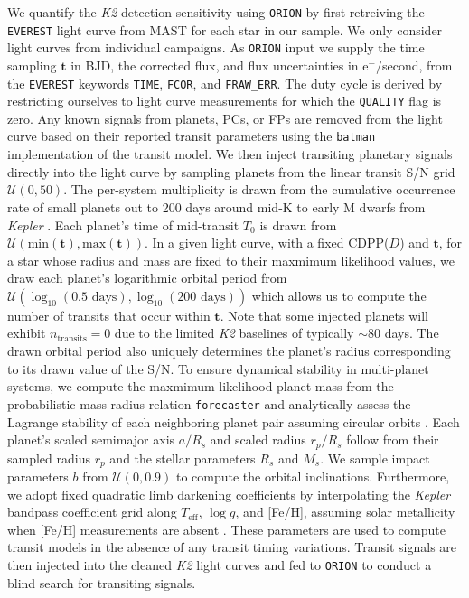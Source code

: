 \documentclass[twocolumn]{emulateapj}
\newcommand{\kepler}[1]{\emph{Kepler}#1}
\newcommand{\ktwo}[1]{\emph{K2}#1}
\newcommand{\teff}[1]{$T_{\text{eff}}$#1}
\newcommand{\logg}[1]{$\log{g}$#1}
\begin{document}
We quantify the \ktwo{} detection sensitivity using \texttt{ORION} by first retreiving the \texttt{EVEREST} light
curve from MAST for each star in our sample. We only consider light curves from individual campaigns. As
\texttt{ORION} input we supply the time sampling $\mathbf{t}$ in BJD, the corrected flux, and flux uncertainties
in e$^-$/second, from the \texttt{EVEREST} keywords \texttt{TIME}, \texttt{FCOR}, and \texttt{FRAW\_ERR}.
The duty cycle is derived by restricting ourselves to light curve
measurements for which the \texttt{QUALITY} flag is zero.
Any known signals from planets, PCs, or FPs are removed from the light
curve based on their reported transit parameters using the \texttt{batman} \citep{kreidberg15} implementation of
the \cite{mandel02} transit model. We then inject transiting planetary signals directly into the light curve
by sampling planets from the linear transit S/N grid $\mathcal{U}(0,50)$. The per-system
multiplicity is drawn
from the cumulative occurrence rate of small planets out to 200 days around
mid-K to early M dwarfs from \kepler{} \citep[$2.5 \pm 0.2$;][]{dressing15a}.
Each planet's time of mid-transit $T_0$ is
drawn from $\mathcal{U}(\text{min}(\mathbf{t}),\text{max}(\mathbf{t}))$.
In a given light curve, with a fixed CDPP($D$) and $\mathbf{t}$, for a star
whose radius and mass are fixed to their maxmimum likelihood values, we
draw each planet's logarithmic orbital period from $\mathcal{U}(\log_{10}(0.5\text{ days}),\log_{10}(200\text{ days}))$
which allows us to compute the number of
transits that occur within $\mathbf{t}$. Note that some injected planets
will exhibit $n_{\text{transits}}=0$ due to the limited \ktwo{} baselines of typically $\sim 80$ days.
The drawn orbital period also uniquely determines the planet's radius corresponding to its drawn value of the S/N.
To ensure dynamical stability in multi-planet
systems, we compute the maxmimum likelihood planet mass from the probabilistic mass-radius relation \texttt{forecaster}
\citep{chen17} and analytically assess the Lagrange stability of each neighboring planet pair assuming circular
orbits \citep{barnes06}. Each planet's scaled semimajor axis $a/R_s$ and scaled radius $r_p/R_s$ follow from
their sampled radius $r_p$ and the stellar parameters $R_s$ and $M_s$. We sample impact parameters $b$ from
$\mathcal{U}(0,0.9)$ to compute the orbital inclinations. Furthermore, we adopt fixed quadratic limb darkening
coefficients by interpolating the \kepler{} bandpass coefficient grid along \teff{,} \logg{,} and [Fe/H], assuming
solar metallicity when [Fe/H] measurements are absent \citep{claret12}.
These parameters are used to compute transit models in the absence of any transit timing variations.
Transit signals are then injected into the cleaned \ktwo{} light curves and fed to
\texttt{ORION} to conduct a blind search for transiting signals.
\end{document}
